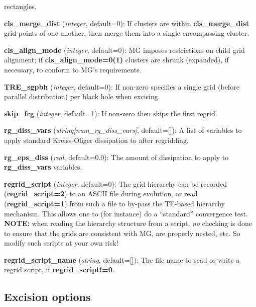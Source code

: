 \documentclass[aps,amssymb,unsortedaddress,nofootinbib]{revtex4}
\def\lsep{\itemsep 0.05in}
\begin{document}
\begin{list}{}{\lsep}
      rectangles.
\item {\bf cls\_merge\_dist} ({\em integer}, default=0): If clusters are 
      within {\bf cls\_merge\_dist} grid points of one another, then
      merge them into a single encompassing cluster.
\item {\bf cls\_align\_mode} ({\em integer}, default=0): MG imposes restrictions
      on child grid alignment; if {\bf cls\_align\_mode=0(1)} clusters are shrunk (expanded),
      if necessary, to conform to MG's requirements.
\item {\bf TRE\_sgpbh} ({\em integer}, default=0): If non-zero specifies a single
      grid (before parallel distribution) per black hole when excising.
\item {\bf skip\_frg} ({\em integer}, default=1): If non-zero then skips the first regrid.
\item {\bf rg\_diss\_vars} ({\em string[num\_rg\_diss\_vars]}, default=[]):
      A list of variables to apply standard Kreiss-Oliger dissipation to after regridding.
\item {\bf rg\_eps\_diss} ({\em real}, default=0.0):
      The amount of dissipation to apply to {\bf rg\_diss\_vars} variables.
\item {\bf regrid\_script} ({\em integer}, default=0): The grid hierarchy can 
      be recorded ({\bf regrid\_script=2}) to an ASCII file during evolution, 
      or read ({\bf regrid\_script=1}) from such a file to by-pass the TE-based 
      hierarchy mechanism. This allows one to (for instance) do a ``standard'' convergence test.
      {\bf NOTE:} when reading the hierarchy structure from a script, {\em no} checking
      is done to ensure that the grids are consistent with MG, are properly nested, etc.
      So modify such scripts at your own risk!
\item {\bf regrid\_script\_name} ({\em string}, default=[]):
      The file name to read or write a regrid script, if {\bf regrid\_script!=0}.
\end{list}

\subsection{Excision options}\label{sec_ex_ops}
\end{document}
